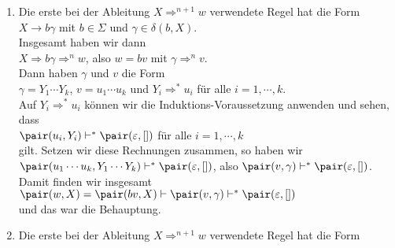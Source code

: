 \begin{enumerate}
            \begin{enumerate}
            \item Die erste bei der Ableitung $X \Rightarrow^{n+1} w$ verwendete Regel hat die Form
                  \\[0.2cm]
                  \hspace*{1.3cm} $X \rightarrow b\gamma$ \quad mit $b \in \Sigma$ und $\gamma \in \delta(b,X)$.
                  \\[0.2cm]
                  Insgesamt haben wir dann
                  \\[0.2cm]
                  \hspace*{1.3cm} $X \Rightarrow b \gamma \Rightarrow^n w$, \quad also $w = bv$ mit $\gamma
                  \Rightarrow^n v$.
                  \\[0.2cm]
                  Dann haben $\gamma$ und $v$ die Form
                  \\[0.2cm]
                  \hspace*{1.3cm} $\gamma = Y_1 \cdots Y_k$, \quad $v = u_1 \cdots u_k$ \quad und \quad $Y_i
                  \Rightarrow^* u_i$ \quad f\"ur alle $i=1,\cdots,k$.
                  \\[0.2cm]
                  Auf $Y_i \Rightarrow^* u_i$ k\"onnen wir die Induktions-Voraussetzung anwenden und sehen, dass
                  \\[0.2cm]
                  \hspace*{1.3cm} 
                  $\pair(u_i, Y_i) \vdash^* \pair(\varepsilon, [])$ \quad f\"ur alle $i=1,\cdots,k$
                  \\[0.2cm]
                  gilt. Setzen wir diese Rechnungen zusammen, so haben wir
                  \\[0.2cm]
                  \hspace*{1.3cm} 
                  $\pair(u_1 \cdots u_k, Y_1 \cdots Y_k) \vdash^* \pair(\varepsilon, [])$, \quad also 
                  \quad $\pair(v,\gamma) \vdash^* \pair(\varepsilon, [])$.
                  \\[0.2cm]
                  Damit finden wir insgesamt
                  \\[0.2cm]
                  \hspace*{1.3cm}
                  $\pair(w,X) = \pair(bv,X) \vdash \pair(v,\gamma) \vdash^* \pair(\varepsilon, [])$
                  \\[0.2cm]
                  und das war die Behauptung.
            \item Die erste bei der Ableitung $X \Rightarrow^{n+1} w$ verwendete Regel hat die Form

\end{enumerate}
\end{enumerate}
